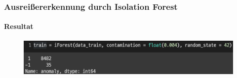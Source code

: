 \documentclass{beamer}
\begin{document}
    \begin{frame}
        \frametitle{Ausreißererkennung durch Isolation Forest}
        \framesubtitle{Resultat}
        
        \begin{figure}[ht]
            \centering
            \includegraphics[scale=0.5]{Resultat1.png}
            \hfil
        
            \hfill 	
            \hfill
         
        \end{figure}
    \end{frame}
    
\end{document}
